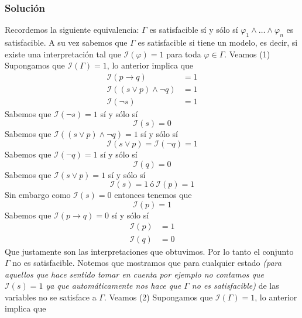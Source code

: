 \documentclass[a4paper]{article}
\begin{document}
\subsubsection{Solución}
\noindent
Recordemos la siguiente equivalencia:
\newline
$\Gamma$ es satisfacible sí y sólo sí $\varphi_1\land\ldots\land\varphi_n$ es
satisfacible.
\newline 
A su vez sabemos que \(\Gamma\) es satisfacible si tiene un modelo, es decir, si existe una 
interpretaci\'on tal que $\mathcal{I}(\varphi)=1$ para toda 
$\varphi\in\Gamma$.
\newline 
Veamos (1)
\newline
Supongamos que \(\mathcal{I}\left(\Gamma\right) = 1\), lo anterior implica que
\begin{align*}
    \mathcal{I} \left(p \to q \right)  &= 1 \\
    \mathcal{I} \left((s \lor p) \land \lnot q \right) &= 1 \\
    \mathcal{I} \left(\lnot s\right)  &= 1
\end{align*}
Sabemos que \(\mathcal{I} \left(\lnot s\right) = 1\) sí y sólo sí
\[
    \mathcal{I} \left(s\right) = 0
\]
Sabemos que \(\mathcal{I} \left((s \lor p) \land \lnot q \right) = 1\) sí y sólo sí
\[
    \mathcal{I} \left(s \lor p \right) =  \mathcal{I} \left(\lnot q \right) = 1
\]
Sabemos que \(\mathcal{I} \left(\lnot q \right) = 1\) sí y sólo sí
\[
    \mathcal{I} \left( q \right) = 0
\]
Sabemos que \(\mathcal{I} \left(s \lor p \right) = 1\) sí y sólo sí
\[
    \mathcal{I} \left(s \right) = 1 \ \text{ó} \ \mathcal{I} \left( p \right) = 1
\]
Sin embargo como \(\mathcal{I} \left(s\right) = 0\) entonces tenemos que
\[
    \mathcal{I} \left( p \right) = 1
\]
Sabemos que \(\mathcal{I} \left(p \to q \right) = 0\) sí y sólo sí
\begin{align*}
    \mathcal{I} \left(p\right) &= 1 \\
    \mathcal{I} \left(q\right) &= 0
\end{align*}
Que justamente son las interpretaciones que obtuvimos. Por lo tanto el conjunto \(\Gamma\) no 
es satisfacible. Notemos que mostramos que para cualquier estado \textit{(para aquellos que hace sentido tomar en cuenta
por ejemplo no contamos que \(\mathcal{I}\left(s\right) = 1\) ya que automáticamente nos hace que \(\Gamma\) no 
es satisfacible)} de las variables no se satisface a \(\Gamma\).
\newline
Veamos (2)
\newline
Supongamos que \(\mathcal{I}\left(\Gamma\right) = 1\), lo anterior implica que
\end{document}
